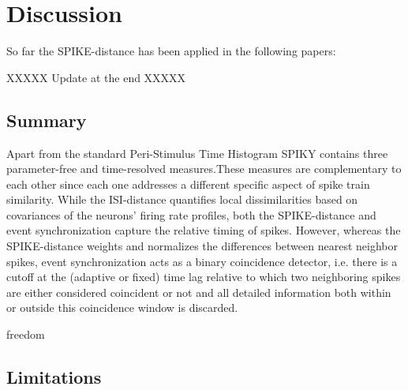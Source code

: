 \documentclass[10pt,twocolumn]{elsart5p}
\begin{document}
%
%
\section{\label{s:Discussion} Discussion}

So far the SPIKE-distance has been applied in the following papers:

\citep{Papoutsi13, DiPoppa13, Rusu14, Sacre14}

XXXXX Update at the end XXXXX


\subsection{\label{ss:Summary} Summary}

Apart from the standard Peri-Stimulus Time Histogram SPIKY contains three parameter-free and time-resolved measures.These measures are complementary to each other since each one addresses a different specific aspect of spike train similarity. While the ISI-distance quantifies local dissimilarities based on covariances of the neurons’ firing rate profiles, both the SPIKE-distance and event synchronization capture the relative timing of spikes. However, whereas the SPIKE-distance weights and normalizes the differences between nearest neighbor spikes, event synchronization acts as a binary coincidence detector, i.e. there is a cutoff at the (adaptive or fixed) time lag relative to which two neighboring spikes are either considered coincident or not and all detailed information both within or outside this coincidence window is discarded. 

freedom



\subsection{\label{ss:Limitations} Limitations}
\end{document}
